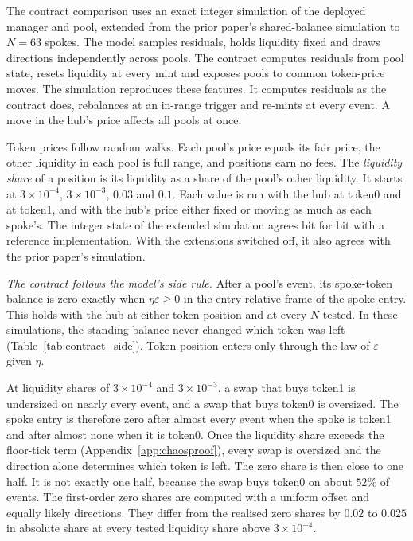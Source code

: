 \documentclass[11pt,a4paper]{article}
\theoremstyle{siphon}
\begin{document}
The contract comparison uses an exact integer simulation of the deployed manager and pool, extended from the prior paper's shared-balance simulation\cite{ryan2026siphon} to $N = 63$ spokes. The model samples residuals, holds liquidity fixed and draws directions independently across pools. The contract computes residuals from pool state, resets liquidity at every mint and exposes pools to common token-price moves. The simulation reproduces these features. It computes residuals as the contract does, rebalances at an in-range trigger and re-mints at every event. A move in the hub's price affects all pools at once.

Token prices follow random walks. Each pool's price equals its fair price, the other liquidity in each pool is full range, and positions earn no fees. The \emph{liquidity share} of a position is its liquidity as a share of the pool's other liquidity. It starts at $3 \times 10^{-4}$, $3 \times 10^{-3}$, $0.03$ and $0.1$. Each value is run with the hub at token0 and at token1, and with the hub's price either fixed or moving as much as each spoke's. The integer state of the extended simulation agrees bit for bit with a reference implementation. With the extensions switched off, it also agrees with the prior paper's simulation.

\emph{The contract follows the model's side rule.} After a pool's event, its spoke-token balance is zero exactly when $\eta\varepsilon \geq 0$ in the entry-relative frame of the spoke entry. This holds with the hub at either token position and at every $N$ tested. In these simulations, the standing balance never changed which token was left (Table~\ref{tab:contract_side}). Token position enters only through the law of $\varepsilon$ given $\eta$.

At liquidity shares of $3 \times 10^{-4}$ and $3 \times 10^{-3}$, a swap that buys token1 is undersized on nearly every event, and a swap that buys token0 is oversized. The spoke entry is therefore zero after almost every event when the spoke is token1 and after almost none when it is token0. Once the liquidity share exceeds the floor-tick term (Appendix~\ref{app:chaosproof}), every swap is oversized and the direction alone determines which token is left. The zero share is then close to one half. It is not exactly one half, because the swap buys token0 on about $52\%$ of events. The first-order zero shares are computed with a uniform offset and equally likely directions. They differ from the realised zero shares by $0.02$ to $0.025$ in absolute share at every tested liquidity share above $3 \times 10^{-4}$.
\end{document}
